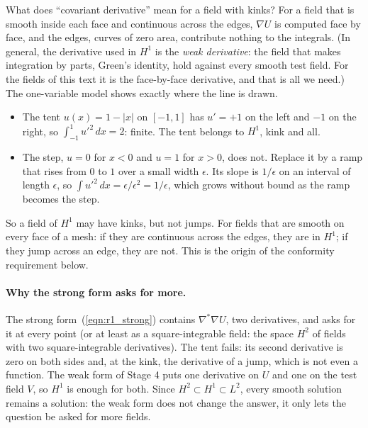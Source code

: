 What does ``covariant derivative'' mean for a field with kinks? For a field that is smooth inside each face and continuous across the edges, $\nabla U$ is computed face by face, and the edges, curves of zero area, contribute nothing to the integrals. (In general, the derivative used in $H^1$ is the \emph{weak derivative}: the field that makes integration by parts, Green's identity, hold against every smooth test field. For the fields of this text it is the face-by-face derivative, and that is all we need.) The one-variable model shows exactly where the line is drawn.
\begin{itemize}
\item The tent $u(x) = 1 - |x|$ on $[-1, 1]$ has $u' = +1$ on the left and $-1$ on the right, so $\int_{-1}^1 u'^2\, dx = 2$: finite. The tent belongs to $H^1$, kink and all.
\item The step, $u = 0$ for $x < 0$ and $u = 1$ for $x > 0$, does not. Replace it by a ramp that rises from $0$ to $1$ over a small width $\epsilon$. Its slope is $1/\epsilon$ on an interval of length $\epsilon$, so $\int u'^2\, dx = \epsilon/\epsilon^2 = 1/\epsilon$, which grows without bound as the ramp becomes the step.
\end{itemize}
So a field of $H^1$ may have kinks, but not jumps. For fields that are smooth on every face of a mesh: if they are continuous across the edges, they are in $H^1$; if they jump across an edge, they are not. This is the origin of the conformity requirement below.

\paragraph{Why the strong form asks for more.} The strong form~(\ref{eqn:r1_strong}) contains $\nabla^*\nabla U$, two derivatives, and asks for it at every point (or at least as a square-integrable field: the space $H^2$ of fields with two square-integrable derivatives). The tent fails: its second derivative is zero on both sides and, at the kink, the derivative of a jump, which is not even a function. The weak form of Stage 4 puts one derivative on $U$ and one on the test field $V$, so $H^1$ is enough for both. Since $H^2 \subset H^1 \subset L^2$, every smooth solution remains a solution: the weak form does not change the answer, it only lets the question be asked for more fields.


